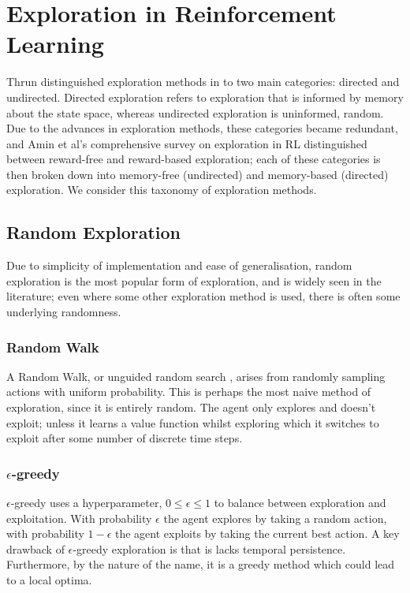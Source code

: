 \section{Exploration in Reinforcement Learning}
Thrun \cite{Thrun-1992-15850} distinguished exploration methods in to two main categories: directed and undirected. Directed exploration refers to exploration that is informed by memory about the state space, whereas undirected exploration is uninformed, random. Due to the advances in exploration methods, these categories became redundant, and Amin et al's \cite{DBLP:journals/corr/abs-2109-00157} comprehensive survey on exploration in RL distinguished between reward-free and reward-based exploration; each of these categories is then broken down into memory-free (undirected) and memory-based (directed) exploration. We consider this taxonomy of exploration methods.
\subsection{Random Exploration}
Due to simplicity of implementation and ease of generalisation, random exploration is the most popular form of exploration, and is widely seen in the literature; even where some other exploration method is used, there is often some underlying randomness.
\subsubsection{Random Walk}
A Random Walk, or unguided random search \cite{anderson86}, arises from randomly sampling actions with uniform probability. This is perhaps the most naive method of exploration, since it is entirely random. The agent only explores and doesn't exploit; unless it learns a value function whilst exploring which it switches to exploit after some number of discrete time steps.
\subsubsection{$\epsilon$-greedy}
$\epsilon$-greedy \cite{Watkins:1989, conf/nips/Sutton95} uses a hyperparameter, $0 \le \epsilon \le 1$ to balance between exploration and exploitation. With probability $\epsilon$ the agent explores by taking a random action, with probability $1-\epsilon$ the agent exploits by taking the current best action. A key drawback of $\epsilon$-greedy exploration is that is lacks temporal persistence. Furthermore, by the nature of the name, it is a greedy method which could lead to a local optima.
